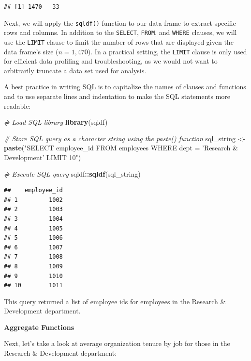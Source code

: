 \documentclass[]{book}
\newenvironment{Shaded}{\begin{snugshade}}{\end{snugshade}}
\newcommand{\CommentTok}[1]{\textcolor[rgb]{0.56,0.35,0.01}{\textit{#1}}}
\newcommand{\KeywordTok}[1]{\textcolor[rgb]{0.13,0.29,0.53}{\textbf{#1}}}
\newcommand{\NormalTok}[1]{#1}
\newcommand{\OperatorTok}[1]{\textcolor[rgb]{0.81,0.36,0.00}{\textbf{#1}}}
\newcommand{\StringTok}[1]{\textcolor[rgb]{0.31,0.60,0.02}{#1}}
\begin{document}
\begin{verbatim}
## [1] 1470   33
\end{verbatim}

Next, we will apply the \texttt{sqldf()} function to our data frame to extract specific rows and columns. In addition to the \texttt{SELECT}, \texttt{FROM}, and \texttt{WHERE} clauses, we will use the \texttt{LIMIT} clause to limit the number of rows that are displayed given the data frame's size (\(n = 1,470\)). In a practical setting, the \texttt{LIMIT} clause is only used for efficient data profiling and troubleshooting, as we would not want to arbitrarily truncate a data set used for analysis.

A best practice in writing SQL is to capitalize the names of clauses and functions and to use separate lines and indentation to make the SQL statements more readable:

\begin{Shaded}
\begin{Highlighting}[]
\CommentTok{# Load SQL library}
\KeywordTok{library}\NormalTok{(sqldf)}

\CommentTok{# Store SQL query as a character string using the paste() function}
\NormalTok{sql_string <-}\StringTok{ }\KeywordTok{paste}\NormalTok{(}\StringTok{"SELECT}
\StringTok{                      employee_id}
\StringTok{                    FROM}
\StringTok{                      employees}
\StringTok{                    WHERE}
\StringTok{                      dept = 'Research & Development'}
\StringTok{                    LIMIT 10"}\NormalTok{)}

\CommentTok{# Execute SQL query}
\NormalTok{sqldf}\OperatorTok{::}\KeywordTok{sqldf}\NormalTok{(sql_string)}
\end{Highlighting}
\end{Shaded}

\begin{verbatim}
##    employee_id
## 1         1002
## 2         1003
## 3         1004
## 4         1005
## 5         1006
## 6         1007
## 7         1008
## 8         1009
## 9         1010
## 10        1011
\end{verbatim}

This query returned a list of employee ids for employees in the Research \& Development department.

\textbf{Aggregate Functions}

Next, let's take a look at average organization tenure by job for those in the Research \& Development department:
\end{document}
